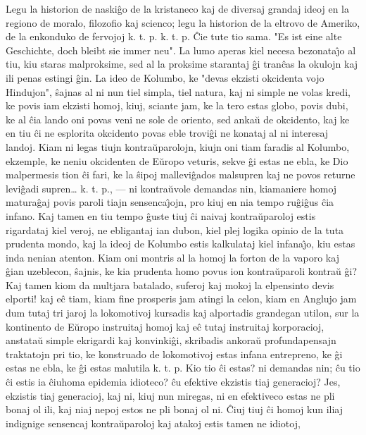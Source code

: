    Legu la historion de naski\^go de la kristaneco kaj de diversaj
grandaj ideoj en la regiono de moralo, filozofio kaj scienco; legu
la historion de la eltrovo de Ameriko, de la enkonduko de fervojoj
k. t. p. k. t. p. \^Cie tute tio sama. "Es ist eine alte
Geschichte, doch bleibt sie immer neu". La lumo aperas kiel necesa
bezonata\^{\j}o al tiu, kiu staras malproksime, sed al la proksime
starantaj \^gi tran\^cas la okulojn kaj ili penas estingi \^gin. La
ideo de Kolumbo, ke "devas ekzisti okcidenta vojo Hindujon",
\^sajnas al ni nun tiel simpla, tiel natura, kaj ni simple ne volas
kredi, ke povis iam ekzisti homoj, kiuj, sciante jam, ke la tero
estas globo, povis dubi, ke al \^cia lando oni povas veni ne sole de
oriento, sed anka\u u de okcidento, kaj ke en tiu \^ci ne esplorita
okcidento povas eble trovi\^gi ne konataj al ni interesaj landoj.
Kiam ni legas tiujn kontra\u uparolojn, kiujn oni tiam faradis al
Kolumbo, ekzemple, ke neniu okcidenten de E\u uropo veturis, sekve
\^gi estas ne ebla, ke Dio malpermesis tion \^ci fari, ke la \^sipoj
mallevi\^gados malsupren kaj ne povos returne levi\^gadi supren\dots
k. t. p., --- ni kontra\u uvole demandas nin, kiamaniere homoj
matura\^gaj povis paroli tiajn sensenca\^{\j}ojn, pro kiuj en nia
tempo ru\^gi\^gus \^cia infano. Kaj tamen en tiu tempo \^guste tiuj
\^ci naivaj kontra\u uparoloj estis rigardataj kiel veroj, ne
ebligantaj ian dubon, kiel plej logika opinio de la tuta prudenta
mondo, kaj la ideoj de Kolumbo estis kalkulataj kiel infana\^{\j}o,
kiu estas inda nenian atenton. Kiam oni montris al la homoj la
forton de la vaporo kaj \^gian uzeblecon, \^sajnis, ke kia prudenta
homo povus ion kontra\u uparoli kontra\u u \^gi? Kaj tamen kiom da
multjara batalado, suferoj kaj mokoj la elpensinto devis elporti!
kaj e\^c tiam, kiam fine prosperis jam atingi la celon, kiam en
Anglujo jam dum tutaj tri jaroj la lokomotivoj kursadis kaj
alportadis grandegan utilon, sur la kontinento de E\u uropo
instruitaj homoj kaj e\^c tutaj instruitaj korporacioj, anstata\u u
simple ekrigardi kaj konvinki\^gi, skribadis ankora\u u
profundapensajn traktatojn pri tio, ke konstruado de lokomotivoj
estas infana entrepreno, ke \^gi estas ne ebla, ke \^gi estas
malutila k. t. p. Kio tio \^ci estas? ni demandas nin; \^cu tio \^ci
estis ia \^ciuhoma epidemia idioteco? \^cu efektive ekzistis tiaj
generacioj? Jes, ekzistis tiaj generacioj, kaj ni, kiuj nun miregas,
ni en efektiveco estas ne pli bonaj ol ili, kaj niaj nepoj estos ne
pli bonaj ol ni. \^Ciuj tiuj \^ci homoj kun iliaj indignige
sensencaj kontra\u uparoloj kaj atakoj estis tamen ne idiotoj,
